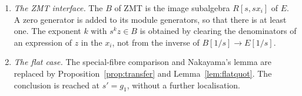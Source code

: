 \documentclass[11pt]{amsart}
\numberwithin{equation}{section}
\theoremstyle{definition}
\theoremstyle{remark}
\newcommand{\m}{\mathfrak m}
\begin{document}
\begin{enumerate}
$yb_i-(XC_i)(y)$ of $\m B$, with coefficients in $\m$; then (they depend
on $p$) those of $gb_i$ and $yb_i$; and Full at the generators of $E$,
for the preimages in Lemma~\ref{lem:u}. Denominators are cleared
(Lemma~\ref{lem:fibre}) by the same induction under the truncation.
\item \emph{The ZMT interface.} The $B$ of ZMT is the image subalgebra
$R[s,sx_i]$ of $E$. A zero generator is added to its module
generators, so that there is at least one. The exponent $k$ with
$s^kz\in B$ is obtained by clearing the denominators of an expression
of $z$ in the $x_i$, not from the inverse of $B[1/s]\to E[1/s]$.
\item \emph{The flat case.} The special-fibre comparison and Nakayama's
lemma are replaced by Proposition~\ref{prop:transfer} and
Lemma~\ref{lem:flatquot}. The conclusion is reached at $s'=g_1$, without
a further localisation.
\end{enumerate}
\end{document}
